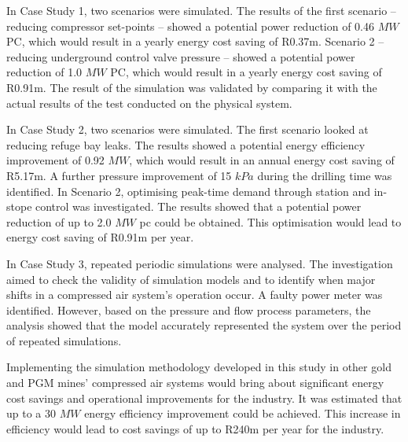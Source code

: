In Case Study 1, two scenarios were simulated. The results of the first scenario – reducing compressor  set-points – showed a potential power reduction of 0.46 $MW$ PC, which would result in a yearly energy cost saving of R0.37m. Scenario 2 – reducing underground control valve pressure – showed a potential power reduction of 1.0 $MW$ PC, which would result in a yearly energy cost saving of R0.91m. The result of the simulation was validated by comparing it with the actual results of the test conducted on the physical system.
	 \par
	 In Case Study 2, two scenarios were simulated. The first scenario looked at reducing refuge bay leaks. The results showed a potential energy efficiency improvement of 0.92 $MW$, which would result in an annual energy cost saving of R5.17m. A further pressure improvement of 15 $kPa$ during the drilling time was identified. In Scenario 2, optimising peak-time demand through station and in-stope control was investigated. The results showed that a potential power reduction of up to 2.0 $MW$ \gls{pc} could be obtained. This optimisation would lead to energy cost saving of R0.91m per year.
	 \par 
	 In Case Study 3, repeated periodic simulations were analysed. The investigation aimed to check the validity of simulation models and to identify when major shifts in a compressed air system’s operation occur. A faulty power meter was identified. However, based on the pressure and flow process parameters, the analysis showed that the model accurately represented the system over the period of repeated simulations.
	 \par
	 Implementing the simulation methodology developed in this study in other gold and PGM mines' compressed air systems would  bring about significant energy cost savings and operational improvements for the industry. It was estimated that up to a 30 $MW$ energy efficiency improvement could be achieved. This increase in efficiency would lead to cost savings of up to R240m per year for the industry. 
